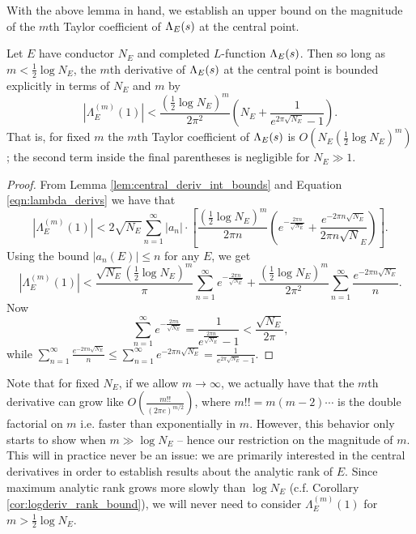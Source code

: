 With the above lemma in hand, we establish an upper bound on the magnitude of the $m$th Taylor coefficient of $\Lambda_E(s)$ at the central point.
\begin{proposition}\label{prop:central_deriv_bounds}
Let $E$ have conductor $N_E$ and completed $L$-function $\Lambda_E(s)$. Then so long as $m<\frac{1}{2}\log N_E$, the $m$th derivative of $\Lambda_E(s)$ at the central point is bounded explicitly in terms of $N_E$ and $m$ by
\begin{equation}
\left| \Lambda_E^{(m)}(1)\right| < \frac{(\frac{1}{2}\log N_E)^m}{2\pi^2}\left(N_E + \frac{1}{e^{2\pi\sqrt{N_E}}-1} \right).
\end{equation}
That is, for fixed $m$ the $m$th Taylor coefficient of $\Lambda_E(s)$ is $O\left( N_E(\frac{1}{2}\log N_E)^m\right)$; the second term inside the final parentheses is negligible for $N_E\gg1$.
\end{proposition}

\begin{proof}
From Lemma \ref{lem:central_deriv_int_bounds} and Equation \ref{eqn:lambda_derivs} we have that
\begin{equation*}
\left| \Lambda_E^{(m)}(1)\right| < 2 \sqrt{N_E} \sum_{n=1}^{\infty} |a_n| \cdot \left[\frac{\left(\frac{1}{2} \log N_E\right)^{m}}{2\pi n}\left( e^{-\frac{2\pi n}{\sqrt{N_E}}} + \frac{e^{-2\pi n\sqrt{N_E}}}{2\pi n \sqrt N_E} \right)\right].
\end{equation*}
Using the bound $|a_n(E)| \le n$ for any $E$, we get
\begin{equation*}
\left| \Lambda_E^{(m)}(1)\right| < \frac{ \sqrt{N_E}\left(\frac{1}{2} \log N_E\right)^{m}}{\pi} \sum_{n=1}^{\infty} e^{-\frac{2\pi n}{\sqrt{N_E}}} + \frac{\left(\frac{1}{2} \log N_E\right)^{m}}{2\pi^2} \sum_{n=1}^{\infty} \frac{e^{-2\pi n\sqrt{N_E}}}{n}.
\end{equation*}
Now
\begin{equation*}
\sum_{n=1}^{\infty} e^{-\frac{2\pi n}{\sqrt{N_E}}} = \frac{1}{e^{\frac{2\pi n}{\sqrt{N_E}}}-1}< \frac{\sqrt{N_E}}{2\pi},
\end{equation*}
while $\sum_{n=1}^{\infty} \frac{e^{-2\pi n\sqrt{N_E}}}{n} \le \sum_{n=1}^{\infty} e^{-2\pi n\sqrt{N_E}} = \frac{1}{e^{2\pi\sqrt{N_E}}-1}$.
\end{proof}

Note that for fixed $N_E$, if we allow $m \to \infty$, we actually have that the $m$th derivative can grow like $O\left(\frac{m!!}{(2\pi e)^{m/2}}\right)$, where $m!! = m(m-2)\cdots$ is the double factorial on $m$ i.e. faster than exponentially in $m$. However, this behavior only starts to show when $m\gg\log N_E$ -- hence our restriction on the magnitude of $m$. This will in practice never be an issue: we are primarily interested in the central derivatives in order to establish results about the analytic rank of $E$. Since maximum analytic rank grows more slowly than $\log N_E$ (c.f. Corollary \ref{cor:logderiv_rank_bound}), we will never need to consider $\Lambda_E^{(m)}(1)$ for $m> \frac{1}{2}\log N_E$. \\


